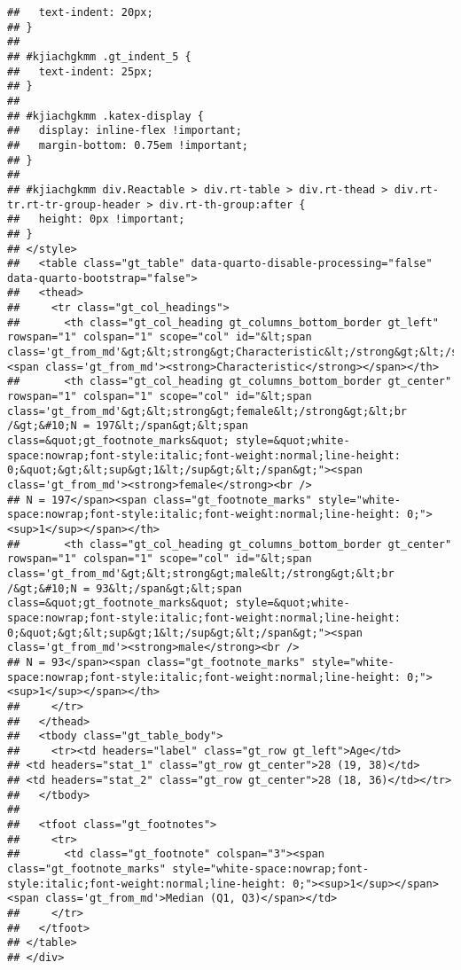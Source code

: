 \documentclass[
]{article}
\begin{document}
\begin{verbatim}
##   text-indent: 20px;
## }
## 
## #kjiachgkmm .gt_indent_5 {
##   text-indent: 25px;
## }
## 
## #kjiachgkmm .katex-display {
##   display: inline-flex !important;
##   margin-bottom: 0.75em !important;
## }
## 
## #kjiachgkmm div.Reactable > div.rt-table > div.rt-thead > div.rt-tr.rt-tr-group-header > div.rt-th-group:after {
##   height: 0px !important;
## }
## </style>
##   <table class="gt_table" data-quarto-disable-processing="false" data-quarto-bootstrap="false">
##   <thead>
##     <tr class="gt_col_headings">
##       <th class="gt_col_heading gt_columns_bottom_border gt_left" rowspan="1" colspan="1" scope="col" id="&lt;span class='gt_from_md'&gt;&lt;strong&gt;Characteristic&lt;/strong&gt;&lt;/span&gt;"><span class='gt_from_md'><strong>Characteristic</strong></span></th>
##       <th class="gt_col_heading gt_columns_bottom_border gt_center" rowspan="1" colspan="1" scope="col" id="&lt;span class='gt_from_md'&gt;&lt;strong&gt;female&lt;/strong&gt;&lt;br /&gt;&#10;N = 197&lt;/span&gt;&lt;span class=&quot;gt_footnote_marks&quot; style=&quot;white-space:nowrap;font-style:italic;font-weight:normal;line-height: 0;&quot;&gt;&lt;sup&gt;1&lt;/sup&gt;&lt;/span&gt;"><span class='gt_from_md'><strong>female</strong><br />
## N = 197</span><span class="gt_footnote_marks" style="white-space:nowrap;font-style:italic;font-weight:normal;line-height: 0;"><sup>1</sup></span></th>
##       <th class="gt_col_heading gt_columns_bottom_border gt_center" rowspan="1" colspan="1" scope="col" id="&lt;span class='gt_from_md'&gt;&lt;strong&gt;male&lt;/strong&gt;&lt;br /&gt;&#10;N = 93&lt;/span&gt;&lt;span class=&quot;gt_footnote_marks&quot; style=&quot;white-space:nowrap;font-style:italic;font-weight:normal;line-height: 0;&quot;&gt;&lt;sup&gt;1&lt;/sup&gt;&lt;/span&gt;"><span class='gt_from_md'><strong>male</strong><br />
## N = 93</span><span class="gt_footnote_marks" style="white-space:nowrap;font-style:italic;font-weight:normal;line-height: 0;"><sup>1</sup></span></th>
##     </tr>
##   </thead>
##   <tbody class="gt_table_body">
##     <tr><td headers="label" class="gt_row gt_left">Age</td>
## <td headers="stat_1" class="gt_row gt_center">28 (19, 38)</td>
## <td headers="stat_2" class="gt_row gt_center">28 (18, 36)</td></tr>
##   </tbody>
##   
##   <tfoot class="gt_footnotes">
##     <tr>
##       <td class="gt_footnote" colspan="3"><span class="gt_footnote_marks" style="white-space:nowrap;font-style:italic;font-weight:normal;line-height: 0;"><sup>1</sup></span> <span class='gt_from_md'>Median (Q1, Q3)</span></td>
##     </tr>
##   </tfoot>
## </table>
## </div>
\end{verbatim}
\end{document}
